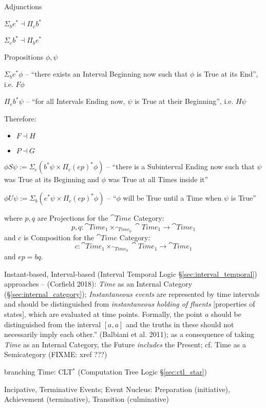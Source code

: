 Adjunctions

$\Sigma_b e^* \dashv \Pi_e b^*$

$\Sigma_e b^* \dashv \Pi_b e^*$

Propositions $\phi, \psi$

$\Sigma_b e^* \phi$ -- ``there exists an Interval Beginning now such
that $\phi$ is True at its End'', i.e. $F \phi$

$\Pi_e b^* \psi$ -- ``for all Intervals Ending now, $\psi$ is True at
their Beginning'', i.e. $H \psi$

Therefore:
\begin{itemize}
  \item $F \dashv H$
  \item $P \dashv G$
\end{itemize}

$\phi S \psi := \Sigma_e (b^* \psi \times \Pi_c(ep)^*\phi)$ -- ``there
is a Subinterval Ending now such that $\psi$ was True at its Beginning
and $\phi$ was True at all Times inside it''

$\phi U \psi := \Sigma_b (e^* \psi \times \Pi_c(ep)^*\phi)$ --
``$\phi$ will be True until a Time when $\psi$ is True''

where $p,q$ are Projections for the $\cat{Time}$ Category:
\[
  p,q : \cat{Time}_1 \times_{\cat{Time}_0} \cat{Time}_1
    \rightarrow \cat{Time}_1
\]
and $c$ is Composition for the $\cat{Time}$ Category:
\[
  c : \cat{Time}_1 \times_{\cat{Time}_0} \cat{Time}_1
    \rightarrow \cat{Time}_1
\]
and $ep = bq$.

Instant-based, Interval-based (Interval Temporal Logic
\S\ref{sec:interval_temporal}) approaches -- (Corfield 2018): \emph{Time} as an
Internal Category (\S\ref{sec:internal_category}); \emph{Instantaneous events}
are represented by time intervals and should be distinguished from
\emph{instantaneous holding of fluents} [properties of states], which are
evaluated at time points. Formally, the point $a$ should be distinguished from
the interval $[a,a]$ and the truths in these should not necessarily imply each
other.'' (Balbiani et al. 2011);
as a consequence of taking \emph{Time} as an
Internal Category, the Future \emph{includes} the Present; cf. Time as a
Semicategory (FIXME: xref ???)

branching Time: CLT$^*$ (Computation Tree Logic \S\ref{sec:ctl_star})

Incipative, Terminative Events; Event Nucleus: Preparation (initiative),
Achievement (terminative), Transition (culminative)

